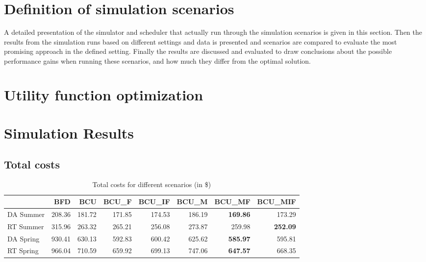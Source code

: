 

\section{Definition of simulation scenarios}

A detailed presentation of the simulator and scheduler that actually run through the simulation scenarios is given in this section. Then the results from the simulation runs based on different settings and data is presented and scenarios are compared to evaluate the most promising approach in the defined setting. Finally the results are discussed and evaluated to draw conclusions about the possible performance gains when running these scenarios, and how much they differ from the optimal solution. 


\section{Utility function optimization}


\section{Simulation Results}







\subsection{Total costs}


\begin{table}[ht]
\centering

\begin{tabular}{lrrrrrrr}
\toprule
{} &     BFD &     BCU &   BCU\_F &  BCU\_IF &   BCU\_M &  BCU\_MF &  BCU\_MIF \\
\midrule
DA Summer &  208.36 &  181.72 &  171.85 &  174.53 &  186.19 &  \textbf{169.86} &   173.29 \\
RT Summer &  315.96 &  263.32 &  265.21 &  256.08 &  273.87 &  259.98 &   \textbf{252.09} \\
DA Spring &  930.41 &  630.13 &  592.83 &  600.42 &  625.62 &  \textbf{585.97} &   595.81 \\
RT Spring &  966.04 &  710.59 &  659.92 &  699.13 &  747.06 &  \textbf{647.57} &   668.35 \\
\bottomrule
\end{tabular}
\caption{Total costs for different scenarios (in \$)}
\end{table}

